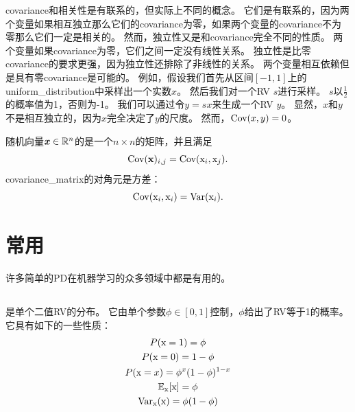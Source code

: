 \gls{covariance}和相关性是有联系的，但实际上不同的概念。
它们是有联系的，因为两个变量如果相互独立那么它们的\gls{covariance}为零，如果两个变量的\gls{covariance}不为零那么它们一定是相关的。
然而，独立性又是和\gls{covariance}完全不同的性质。
两个变量如果\gls{covariance}为零，它们之间一定没有线性关系。
独立性是比零\gls{covariance}的要求更强，因为独立性还排除了非线性的关系。
两个变量相互依赖但是具有零\gls{covariance}是可能的。
例如，假设我们首先从区间$[-1, 1]$上的\gls{uniform_distribution}中采样出一个实数$x$。
然后我们对一个\gls{RV} $s$进行采样。
$s$以$\frac{1}{2}$的概率值为1，否则为-1。
我们可以通过令$y=sx$来生成一个\gls{RV} $y$。
显然，$x$和$y$不是相互独立的，因为$x$完全决定了$y$的尺度。
然而，$\text{Cov}(x,y)=0$。


随机向量$\boldsymbol{\mathit{x}} \in \mathbb{R}^n$的是一个$n\times n$的矩阵，并且满足
\begin{equation}
\text{Cov}(\mathbf{x})_{i,j} = \text{Cov}(\mathrm{x}_i, \mathrm{x}_j).
\end{equation}
\gls{covariance_matrix}的对角元是方差：
\begin{equation}
\text{Cov}(\mathrm{x}_i, \mathrm{x}_i) = \text{Var}(\mathrm{x}_i).
\end{equation}

\section{常用}
\label{sec:common_probability_distributions}

许多简单的\gls{PD}在机器学习的众多领域中都是有用的。

\subsection{}
\label{sec:bernoulli_distribution}

是单个二值\gls{RV}的分布。
它由单个参数$\phi \in [0, 1]$控制，$\phi$给出了\gls{RV}等于1的概率。
它具有如下的一些性质：
\begin{gather}
P(\mathrm{x} =1) = \phi\\
P(\mathrm{x} =0) = 1-\phi\\
P(\mathrm{x} = x) = \phi^x (1-\phi)^{1-x}\\
\mathbb{E}_{\mathrm{x}}[\mathrm{x}] = \phi\\
\text{Var}_{\mathrm{x}}(\mathrm{x}) = \phi(1-\phi)
\end{gather}

\subsection{}
\label{sec:multinoulli_distribution}

